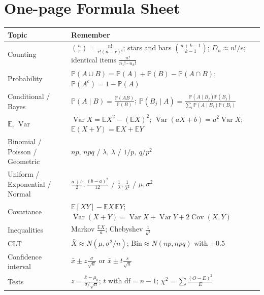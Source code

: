 \documentclass[11pt,a4paper]{article}
\newcommand{\E}{\mathbb{E}}
\newcommand{\Var}{\operatorname{Var}}
\newcommand{\Cov}{\operatorname{Cov}}
\renewcommand{\Pr}{\mathbb{P}}
\newcommand{\given}{\mid}
\begin{document}
\section{One-page Formula Sheet}
\small
\begin{center}
\begin{tabularx}{\textwidth}{>{\raggedright\arraybackslash}p{3.3cm} >{\raggedright\arraybackslash}X}
\toprule
\textbf{Topic} & \textbf{Remember}\\
\midrule
Counting & $\binom nr=\frac{n!}{r!(n-r)!}$; stars and bars $\binom{n+k-1}{k-1}$; $D_n\approx n!/e$; identical items $\frac{n!}{n_1!\cdots n_k!}$\\
Probability & $\Pr(A\cup B)=\Pr(A)+\Pr(B)-\Pr(A\cap B)$; $\Pr(A^c)=1-\Pr(A)$\\
Conditional / Bayes & $\Pr(A\given B)=\frac{\Pr(AB)}{\Pr(B)}$; $\Pr(B_j\given A)=\frac{\Pr(A\given B_j)\Pr(B_j)}{\sum_i\Pr(A\given B_i)\Pr(B_i)}$\\
$\E$, $\Var$ & $\Var X=\E X^2-(\E X)^2$; $\Var(aX+b)=a^2\Var X$; $\E(X+Y)=\E X+\E Y$\\
Binomial / Poisson / Geometric & $np,\,npq$ \;/\; $\lambda,\,\lambda$ \;/\; $1/p,\ q/p^2$\\
Uniform / Exponential / Normal & $\frac{a+b}2,\frac{(b-a)^2}{12}$ \;/\; $\frac1\lambda,\frac1{\lambda^2}$ \;/\; $\mu,\sigma^2$\\
Covariance & $\E[XY]-\E X\,\E Y$; $\Var(X+Y)=\Var X+\Var Y+2\Cov(X,Y)$\\
Inequalities & Markov $\frac{\E X}{a}$; Chebyshev $\frac1{k^2}$\\
CLT & $\bar X\approx N(\mu,\sigma^2/n)$; $\text{Bin}\approx N(np,npq)$ with $\pm0.5$\\
Confidence interval & $\bar x\pm z\frac{\sigma}{\sqrt n}$ or $\bar x\pm t\frac{s}{\sqrt n}$\\
Tests & $z=\frac{\bar x-\mu_0}{\sigma/\sqrt n}$; $t$ with $\mathrm{df}=n-1$; $\chi^2=\sum\frac{(O-E)^2}{E}$\\
\bottomrule
\end{tabularx}
\end{center}
\normalsize

\end{document}
